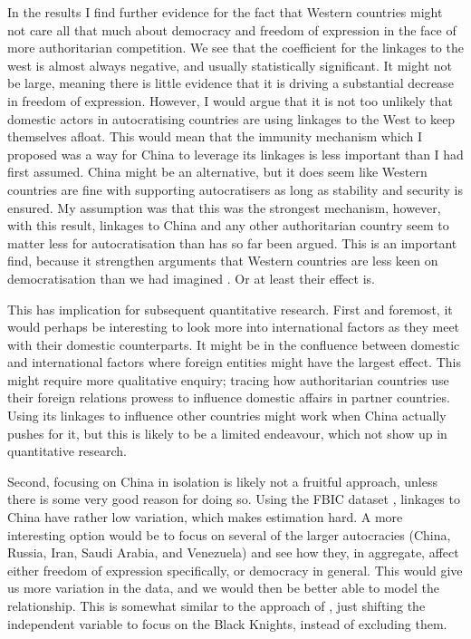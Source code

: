 In the results I find further evidence for the fact that Western countries might not care all that much about democracy and freedom of expression in the face of more authoritarian competition. We see that the coefficient for the linkages to the west is almost always negative, and usually statistically significant. It might not be large, meaning there is little evidence that it is driving a substantial decrease in freedom of expression. However, I would argue that it is not too unlikely that domestic actors in autocratising countries are using linkages to the West to keep themselves afloat. This would mean that the immunity mechanism which I proposed was a way for China to leverage its linkages is less important than I had first assumed. China might be an alternative, but it does seem like Western countries are fine with supporting autocratisers as long as stability and security is ensured. My assumption was that this was the strongest mechanism, however, with this result, linkages to China and any other authoritarian country seem to matter less for autocratisation than has so far been argued. This is an important find, because it strengthen arguments that Western countries are less keen on democratisation than we had imagined \citep{borzel_noble_2015, delcour_spoiler_2015, freyburg_local_2015, risse_democracy_2015}. Or at least their effect is. 

This has implication for subsequent quantitative research. First and foremost, it would perhaps be interesting to look more into international factors as they meet with their domestic counterparts. It might be in the confluence between domestic and international factors where foreign entities might have the largest effect. This might require more qualitative enquiry; tracing how authoritarian countries use their foreign relations prowess to influence domestic affairs in partner countries. Using its linkages to influence other countries might work when China actually pushes for it, but this is likely to be a limited endeavour, which not show up in quantitative research. 

Second, focusing on China in isolation is likely not a fruitful approach, unless there is some very good reason for doing so. Using the FBIC dataset \citep{moyer_china-us_2021}, linkages to China have rather low variation, which makes estimation hard. A more interesting option would be to focus on several of the larger autocracies (China, Russia, Iran, Saudi Arabia, and Venezuela) and see how they, in aggregate, affect either freedom of expression specifically, or democracy in general. This would give us more variation in the data, and we would then be better able to model the relationship. This is somewhat similar to the approach of \citet{tansey_ties_2017}, just shifting the independent variable to focus on the Black Knights, instead of excluding them. 

